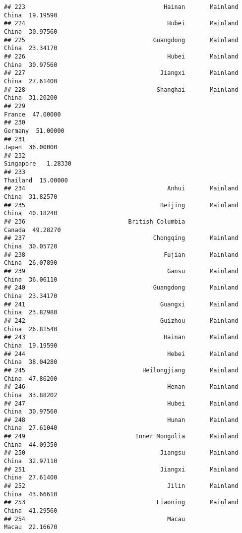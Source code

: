 \documentclass[
]{article}
\begin{document}
\begin{verbatim}
## 223                                       Hainan       Mainland China  19.19590
## 224                                        Hubei       Mainland China  30.97560
## 225                                    Guangdong       Mainland China  23.34170
## 226                                        Hubei       Mainland China  30.97560
## 227                                      Jiangxi       Mainland China  27.61400
## 228                                     Shanghai       Mainland China  31.20200
## 229                                                            France  47.00000
## 230                                                           Germany  51.00000
## 231                                                             Japan  36.00000
## 232                                                         Singapore   1.28330
## 233                                                          Thailand  15.00000
## 234                                        Anhui       Mainland China  31.82570
## 235                                      Beijing       Mainland China  40.18240
## 236                             British Columbia               Canada  49.28270
## 237                                    Chongqing       Mainland China  30.05720
## 238                                       Fujian       Mainland China  26.07890
## 239                                        Gansu       Mainland China  36.06110
## 240                                    Guangdong       Mainland China  23.34170
## 241                                      Guangxi       Mainland China  23.82980
## 242                                      Guizhou       Mainland China  26.81540
## 243                                       Hainan       Mainland China  19.19590
## 244                                        Hebei       Mainland China  38.04280
## 245                                 Heilongjiang       Mainland China  47.86200
## 246                                        Henan       Mainland China  33.88202
## 247                                        Hubei       Mainland China  30.97560
## 248                                        Hunan       Mainland China  27.61040
## 249                               Inner Mongolia       Mainland China  44.09350
## 250                                      Jiangsu       Mainland China  32.97110
## 251                                      Jiangxi       Mainland China  27.61400
## 252                                        Jilin       Mainland China  43.66610
## 253                                     Liaoning       Mainland China  41.29560
## 254                                        Macau                Macau  22.16670

\end{verbatim}
\end{document}
